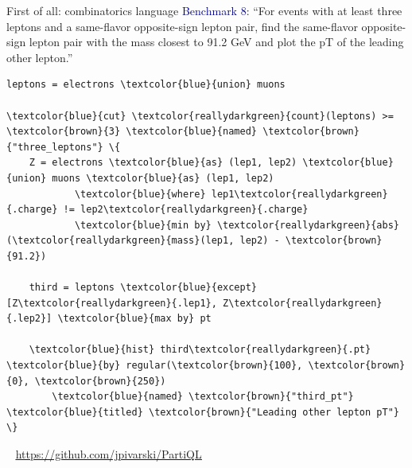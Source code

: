 \documentclass[aspectratio=169]{beamer}
\begin{document}
\begin{frame}[fragile]{First of all: combinatorics language}
\vspace{0.3 cm}
\textcolor{darkblue}{Benchmark 8}: ``For events with at least three leptons and a same-flavor opposite-sign lepton pair, find the same-flavor opposite-sign lepton pair with the mass closest to 91.2 GeV and plot the pT of the leading other lepton.''

\small
\vspace{0.2 cm}
\begin{Verbatim}[commandchars=\\\{\}]
leptons = electrons \textcolor{blue}{union} muons

\textcolor{blue}{cut} \textcolor{reallydarkgreen}{count}(leptons) >= \textcolor{brown}{3} \textcolor{blue}{named} \textcolor{brown}{"three_leptons"} \{
    Z = electrons \textcolor{blue}{as} (lep1, lep2) \textcolor{blue}{union} muons \textcolor{blue}{as} (lep1, lep2)
            \textcolor{blue}{where} lep1\textcolor{reallydarkgreen}{.charge} != lep2\textcolor{reallydarkgreen}{.charge}
            \textcolor{blue}{min by} \textcolor{reallydarkgreen}{abs}(\textcolor{reallydarkgreen}{mass}(lep1, lep2) - \textcolor{brown}{91.2})

    third = leptons \textcolor{blue}{except} [Z\textcolor{reallydarkgreen}{.lep1}, Z\textcolor{reallydarkgreen}{.lep2}] \textcolor{blue}{max by} pt

    \textcolor{blue}{hist} third\textcolor{reallydarkgreen}{.pt} \textcolor{blue}{by} regular(\textcolor{brown}{100}, \textcolor{brown}{0}, \textcolor{brown}{250})
        \textcolor{blue}{named} \textcolor{brown}{"third_pt"} \textcolor{blue}{titled} \textcolor{brown}{"Leading other lepton pT"}
\}
\end{Verbatim}

\mbox{ } \hfill \textcolor{blue}{\underline{\url{https://github.com/jpivarski/PartiQL}}} \hfill \mbox{ }
\end{frame}
\end{document}
